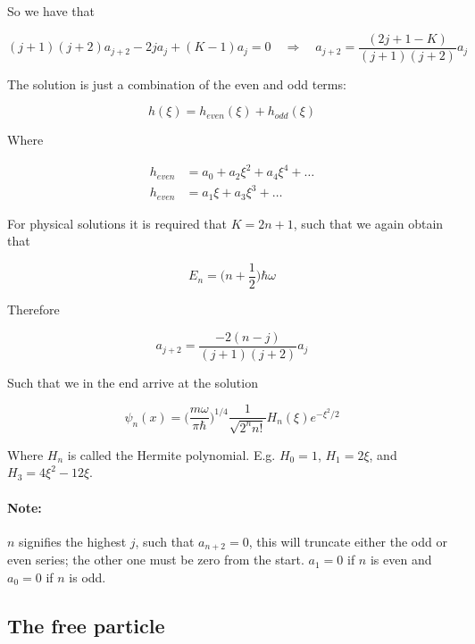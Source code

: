 \documentclass[a4paper]{article}
\begin{document}
So we have that

\begin{equation}
	(j+1)(j+2)a_{j+2}-2ja_j+(K-1)a_j=0\quad\Rightarrow\quad a_{j+2}=\frac{(2j+1-K)}{(j+1)(j+2)}a_j
\end{equation}

The solution is just a combination of the even and odd terms:

\begin{equation}
	h(\xi)=h_{even}(\xi)+h_{odd}(\xi)
\end{equation}

Where 

\begin{align}
	h_{even}&=a_0+a_2\xi^2+a_4\xi^4+\dots\\[0.5em]
	h_{even}&=a_1\xi+a_3\xi^3+\dots
\end{align}

For physical solutions it is required that $K=2n+1$, such that we again obtain that

\begin{equation}
	E_n=\bigg(n+\frac{1}{2}\bigg)\hbar\omega
\end{equation}

Therefore

\begin{equation}
 a_{j+2}=\frac{-2(n-j)}{(j+1)(j+2)}a_j
\end{equation}

Such that we in the end arrive at the solution

\begin{equation}
	\psi_n(x)=\bigg(\frac{m\omega}{\pi\hbar}\bigg)^{1/4}\frac{1}{\sqrt{2^n n!}}H_n(\xi)e^{-\xi^2/2}
\end{equation}

Where $H_n$ is called the Hermite polynomial. E.g. $H_0=1$, $H_1=2\xi$, and $H_3=4\xi^2-12\xi$.

\bigskip

\paragraph{Note:} $n$ signifies the highest $j$, such that $a_{n+2}=0$, this will truncate either the odd or even series; the other one must be zero from the start. $a_1=0$ if $n$ is even and $a_0=0$ if $n$ is odd.

\subsection{The free particle}
\end{document}
